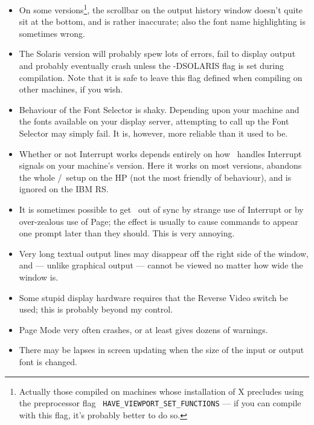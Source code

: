\begin{itemize}

\item On some versions\footnote{Actually those compiled on machines
whose installation of X precludes using the preprocessor flag {\tt
HAVE\_VIEWPORT\_SET\_FUNCTIONS} --- if you can compile with this flag,
it's probably better to do so.}, the scrollbar on the output history
window doesn't quite sit at the bottom, and is rather inaccurate; also
the font name highlighting is sometimes wrong.

\item The Solaris version will probably spew lots of errors, fail to
display output and probably eventually crash unless the -DSOLARIS flag
is set during compilation.  Note that it is safe to leave this flag
defined when compiling on other machines, if you wish.

\item Behaviour of the Font Selector is shaky.  Depending upon your
machine and the fonts available on your display server, attempting to
call up the Font Selector may simply fail.  It is, however, more
reliable than it used to be.

\item Whether or not Interrupt works depends entirely on how \REDUCE\
handles Interrupt signals on your machine's version.  Here it works on
most versions, abandons the whole \REDUCE{}/\xr\ setup on the HP (not
the most friendly of behaviour), and is ignored on the IBM RS.

\item It is sometimes possible to get \xr\ out of sync by strange use
of Interrupt or by over-zealous use of Page; the effect is usually to
cause commands to appear one prompt later than they should.  This is
very annoying.

\item Very long textual output lines may disappear off the right side
of the window, and --- unlike graphical output --- cannot be viewed no
matter how wide the window is.

\item Some stupid display hardware requires that the Reverse Video
switch be used; this is probably beyond my control.

\item Page Mode very often crashes, or at least gives dozens of
warnings.

\item There may be lapses in screen updating when the size of the
input or output font is changed.


\end{itemize}
